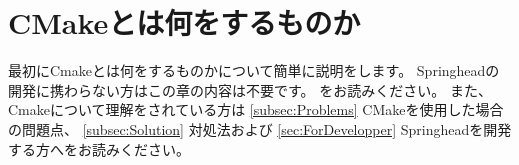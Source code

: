 \newpage
\section{CMakeとは何をするものか}
\label{sec:WhatCMakeWillDo}

\def\Anno#1{\mc{\footnotesize{ \CDots\  #1}}}
\def\SolutionFile{\hbox{ソリューションファイル{\small{$^{(\dagger 1)}$}}}}
\def\ProjectFile{\hbox{プロジェクトファイル{\small{$^{(\dagger 2)}$}}}}
\def\cmake{\tt{cmake}}
\def\make{\tt{make}}
\def\SprLib{Springheadライブラリ}
\def\SprProj{Springheadプロジェクト}
\def\VS{Visual Studio}

\def\SprTop#1{\Path{C:/Springhead{#1}}}
\def\AppTop#1{\Path{C:/Develop/Application{#1}}}
\def\build{{\it{build\/}}}

\def\CMakeLists#1{\Path{CMakeLists.txt{#1}}}
\def\CMakeOpts#1{\Path{CMakeOpts.txt{#1}}}
\def\CMakeConf#1{\Path{CMakeConf.txt{#1}}}
\def\CMakeTopdir#1{\Path{CMakeTopdir.txt{#1}}}

\def\thinrule#1{\makebox[#1][l]{\vrule width #1 height 0.1pt}}


\noindent
最初にCmakeとは何をするものかについて簡単に説明をします。
Springheadの開発に携わらない方はこの章の内容は不要です。
をお読みください。
また、Cmakeについて理解をされている方は
\UpKQs \ref{subsec:Problems} CMakeを使用した場合の問題点\UpKQe、
\UpKQs \ref{subsec:Solution} 対処法\UpKQe および
\UpKQs \ref{sec:ForDevelopper} Springheadを開発する方へ\UpKQe をお読みください。

